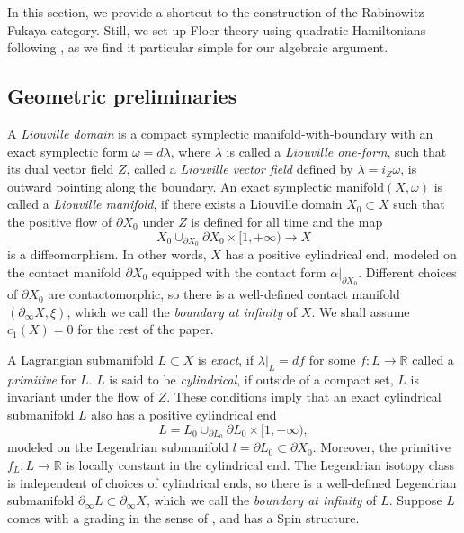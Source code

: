\documentclass[11pt]{amsproc}
\def\R{{\mathbb R}}
\def\p{\partial}
\theoremstyle{remark}
\numberwithin{equation}{section}
\begin{document}
In this section, we provide a shortcut to the construction of the Rabinowitz Fukaya category.
Still, we set up Floer theory using quadratic Hamiltonians following \cites{abouzaid_gc, GGV}, 
as we find it particular simple for our algebraic argument.

\subsection{Geometric preliminaries}

A {\it Liouville domain} is a compact symplectic manifold-with-boundary with an exact symplectic form $\omega = d\lambda$,
where $\lambda$ is called a {\it Liouville one-form},
such that its dual vector field $Z$, called a {\it Liouville vector field} defined by $\lambda = i_{Z}\omega$,
 is outward pointing along the boundary. 
An exact symplectic manifold$(X, \omega)$ is called a {\it Liouville manifold}, 
if there exists a Liouville domain $X_{0} \subset X$ such that the positive flow of $\p X_{0}$ under $Z$ is defined for all time and the map 
\begin{equation}\label{cylindrical end}
X_{0} \cup_{\p X_{0}} \p X_{0} \times [1, +\infty) \to X
\end{equation}
 is a diffeomorphism.
In other words, $X$ has a positive cylindrical end,
modeled on the contact manifold $\p X_{0}$ equipped with the contact form $\alpha|_{\p X_{0}}$.
Different choices of $\p X_{0}$ are contactomorphic, 
so there is a well-defined contact manifold $(\p_{\infty} X, \xi)$,
which we call the {\it boundary at infinity} of $X$.
We shall assume $c_{1}(X)=0$ for the rest of the paper.

A Lagrangian submanifold $L \subset X$ is {\it exact}, 
if $\lambda|_{L} = df$ for some $f: L \to \R$ called a {\it primitive} for $L$.
$L$ is said to be {\it cylindrical}, if outside of a compact set, $L$ is invariant under the flow of $Z$.
These conditions imply that an exact cylindrical submanifold $L$ also has a positive cylindrical end
\begin{equation}
L = L_{0} \cup_{\p L_{0}} \p L_{0} \times [1, +\infty),
\end{equation}
modeled on the Legendrian submanifold $l = \p L_{0} \subset \p X_{0}$.
Moreover, the primitive $f_{L}: L \to \R$ is locally constant in the cylindrical end.
The Legendrian isotopy class is independent of choices of cylindrical ends,
so there is a well-defined Legendrian submanifold $\p_{\infty} L \subset \p_{\infty} X$,
which we call the {\it boundary at infinity} of $L$.
Suppose $L$ comes with a grading in the sense of \cite{seidel_graded},
and has a Spin structure.
\end{document}
